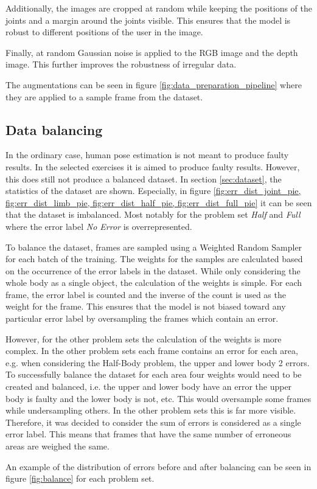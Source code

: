 Additionally, the images are cropped at random while keeping the positions of the joints and a margin around the joints visible. This ensures that the model is robust to different positions of the user in the image. 

Finally, at random Gaussian noise is applied to the RGB image and the depth image. This further improves the robustness of irregular data.

The augmentations can be seen in figure \ref{fig:data_preparation_pipeline} where they are applied to a sample frame from the dataset.

\subsection{Data balancing}

In the ordinary case, human pose estimation is not meant to produce faulty results. In the selected exercises it is aimed to produce faulty results. However, this does still not produce a balanced dataset. In section \ref{sec:dataset}, the statistics of the dataset are shown. Especially, in figure \ref{fig:err_dist_joint_pie, fig:err_dist_limb_pie, fig:err_dist_half_pie, fig:err_dist_full_pie} it can be seen that the dataset is imbalanced. Most notably for the problem set \textit{Half} and \textit{Full} where the error label \textit{No Error} is overrepresented.

To balance the dataset, frames are sampled using a Weighted Random Sampler for each batch of the training. The weights for the samples are calculated based on the occurrence of the error labels in the dataset. While only considering the whole body as a single object, the calculation of the weights is simple. For each frame, the error label is counted and the inverse of the count is used as the weight for the frame. This ensures that the model is not biased toward any particular error label by oversampling the frames which contain an error.

However, for the other problem sets the calculation of the weights is more complex. In the other problem sets each frame contains an error for each area, e.g. when considering the Half-Body problem, the upper and lower body 2 errors. To successfully balance the dataset for each area four weights would need to be created and balanced, i.e. the upper and lower body have an error the upper body is faulty and the lower body is not, etc. This would oversample some frames while undersampling others. In the other problem sets this is far more visible. Therefore, it was decided to consider the sum of errors is considered as a single error label. This means that frames that have the same number of erroneous areas are weighed the same.

An example of the distribution of errors before and after balancing can be seen in figure \ref{fig:balance} for each problem set.
